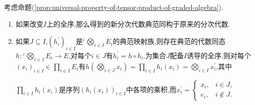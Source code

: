 \begin{remark}{}{}
	考虑命题(\cref{prop:universal-property-of-tensor-product-of-graded-algebra}).
	\begin{enumerate}
		\item 如果改变$I$上的全序,那么得到的新分次代数典范同构于原来的分次代数.
		\item 如果$J\subseteq I$,$\left(h_{i}^{\prime}\right)_{i\in I}$是${}^{\varepsilon}\bigotimes\limits_{i\in I}E_{i}$的典范映射族,则存在典范的代数同态$h:{}^{\varepsilon}\bigotimes\limits_{i\in I}E_{i}\to E$,对每个$i\in J$有$h_{i}^{\prime}=h\circ h_{i}$.为集合$J$配备$I$诱导的全序,则对每个$\left(x_{i}\right)_{i\in I}\in\prod\limits_{i\in I}E_{i}$有$h\left(\bigotimes\limits_{i\in J}x_{i}\right)=\prod\limits_{i\in I}h_{i}\left(x_{i}\right)=\bigotimes\limits_{i\in I}x_{i}^{\prime}$,其中
		\begin{center}
			$\prod\limits_{i\in I}h_{i}\left(x_{i}\right)$是序列$\left(h_{i}\left(x_{i}\right)\right)_{i\in I}$中各项的乘积,而$x_{i}^{\prime}=
			\begin{cases}
				x_{i},&i\in J,\\
				e_{i},&i\notin J.
			\end{cases}$
		\end{center}
	\end{enumerate}
\end{remark}

